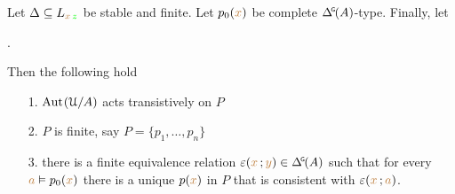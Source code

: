 \begin{theorem}\label{thm_FER}
  Let $\Delta\subseteq L_{{\color{brown} x}\,{\color{green} z}}$ be stable and finite.
  Let $p_0({\color{brown} x})$ be complete $\GDelta(A)$-type.
  Finally, let 
  
  .
  
  Then the following hold
  \begin{itemize}
    \item [1.] ${\rm Aut\kern.15ex}(\EuScript U/A)$ acts transistively on $P$
    \item [2.] $P$ is finite, say $P=\{p_1,\dots,p_n\}$
    
    \item [3.] there is a finite equivalence relation $\epsilon({\mr x}\,;{\mr y})\in\GDelta(A)$ such that for every ${\color{brown} a}\vDash p_0({\color{brown} x})$ there is a unique $p({\color{brown} x})$ in $P$ that is consistent with $\varepsilon({\color{brown} x}\,;{\color{brown} a})$.
  \end{itemize}
\end{theorem}

